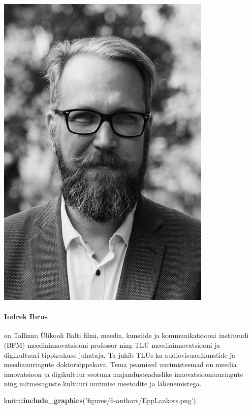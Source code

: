 \documentclass[estonian,]{article}
\newenvironment{Shaded}{\begin{snugshade}}{\end{snugshade}}
\newcommand{\KeywordTok}[1]{\textcolor[rgb]{0.13,0.29,0.53}{\textbf{#1}}}
\newcommand{\NormalTok}[1]{#1}
\newcommand{\OperatorTok}[1]{\textcolor[rgb]{0.81,0.36,0.00}{\textbf{#1}}}
\newcommand{\StringTok}[1]{\textcolor[rgb]{0.31,0.60,0.02}{#1}}
\let\oldparagraph\paragraph
\renewcommand{\paragraph}[1]{\oldparagraph{#1}\mbox{}}
\begin{document}
\begin{flushleft}\includegraphics[width=0.5\linewidth]{figures/6-authors/IndrekIbrus} \end{flushleft}

\hypertarget{indrek-ibrus}{%
\paragraph{Indrek Ibrus}\label{indrek-ibrus}}

on Tallinna Ülikooli Balti filmi, meedia, kunstide ja kommunikatsiooni instituudi (BFM) meediainnovatsiooni professor ning TLÜ meediainnovatsiooni ja digikultuuri tippkeskuse juhataja. Ta juhib TLÜs ka audiovisuaalkunstide ja meediauuringute doktoriõppekava. Tema peamised uurimisteemad on meedia innovatsioon ja digikultuur seotuna majandusteaduslike innovatsiooniuuringute ning mitmesuguste kultuuri uurimise meetodite ja lähenemistega.

\begin{Shaded}
\begin{Highlighting}[]
\NormalTok{knitr}\OperatorTok{::}\KeywordTok{include_graphics}\NormalTok{(}\StringTok{'figures/6-authors/EppLankots.png'}\NormalTok{)}
\end{Highlighting}
\end{Shaded}
\end{document}

